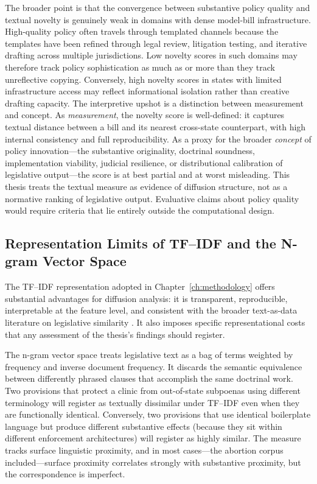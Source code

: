 The broader point is that the convergence between substantive policy quality and textual novelty is genuinely weak in domains with dense model-bill infrastructure. High-quality policy often travels through templated channels because the templates have been refined through legal review, litigation testing, and iterative drafting across multiple jurisdictions. Low novelty scores in such domains may therefore track policy sophistication as much as or more than they track unreflective copying. Conversely, high novelty scores in states with limited infrastructure access may reflect informational isolation rather than creative drafting capacity. The interpretive upshot is a distinction between measurement and concept. As \emph{measurement}, the novelty score is well-defined: it captures textual distance between a bill and its nearest cross-state counterpart, with high internal consistency and full reproducibility. As a proxy for the broader \emph{concept} of policy innovation---the substantive originality, doctrinal soundness, implementation viability, judicial resilience, or distributional calibration of legislative output---the score is at best partial and at worst misleading. This thesis treats the textual measure as evidence of diffusion structure, not as a normative ranking of legislative output. Evaluative claims about policy quality would require criteria that lie entirely outside the computational design.

\subsection{Representation Limits of TF--IDF and the N-gram Vector Space}
\label{subsec:tfidf-limits}
The TF--IDF representation adopted in Chapter~\ref{ch:methodology} offers substantial advantages for diffusion analysis: it is transparent, reproducible, interpretable at the feature level, and consistent with the broader text-as-data literature on legislative similarity \parencite{wilkersonTracingFlowPolicy2015, linderTextPolicyMeasuring2020}. It also imposes specific representational costs that any assessment of the thesis's findings should register.

The n-gram vector space treats legislative text as a bag of terms weighted by frequency and inverse document frequency. It discards the semantic equivalence between differently phrased clauses that accomplish the same doctrinal work. Two provisions that protect a clinic from out-of-state subpoenas using different terminology will register as textually dissimilar under TF--IDF even when they are functionally identical. Conversely, two provisions that use identical boilerplate language but produce different substantive effects (because they sit within different enforcement architectures) will register as highly similar. The measure tracks surface linguistic proximity, and in most cases---the abortion corpus included---surface proximity correlates strongly with substantive proximity, but the correspondence is imperfect.


